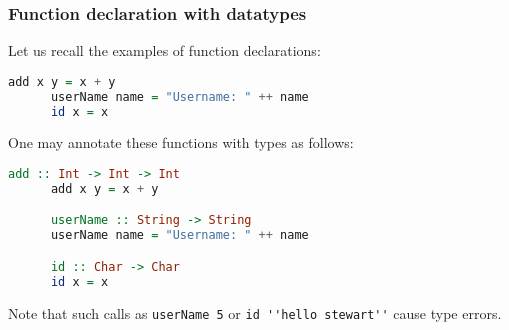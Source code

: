 \documentclass[10pt,pdf,utf8,russian,aspectratio=169]{beamer}
\begin{document}
\begin{frame}[fragile]
  \frametitle{Function declaration with datatypes}

  Let us recall the examples of function declarations:

    \begin{lstlisting}[language=Haskell]
      add x y = x + y
      userName name = "Username: " ++ name
      id x = x
    \end{lstlisting}

    \vspace{\baselineskip}

    One may annotate these functions with types as follows:

    \begin{lstlisting}[language=Haskell]
      add :: Int -> Int -> Int
      add x y = x + y

      userName :: String -> String
      userName name = "Username: " ++ name

      id :: Char -> Char
      id x = x
    \end{lstlisting}

\vspace{\baselineskip}

  Note that such calls as \verb"userName 5" or \verb"id ''hello stewart''" cause type errors.

\end{frame}
\end{document}
